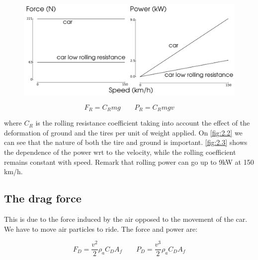 	\begin{figure}
	\vspace{-5mm}
	\includegraphics[scale=0.3]{ch2/3}
	\label{fig:2.3}
	\end{figure}
	\begin{equation}
	F_R = C_R m g \qquad P_R = C_R mg v
	\end{equation}
	
	where $C_R$ is the rolling resistance coefficient taking into account the effect of the deformation of ground and the tires per unit of weight applied. On \autoref{fig:2.2} we can see that the nature of both the tire and ground is important. \autoref{fig:2.3} shows the dependence of the power wrt to the velocity, while the rolling coefficient remains constant with speed. Remark that rolling power can go up to 9kW at 150 km/h. 
	
\subsection{The drag force}
	This is due to the force induced by the air opposed to the movement of the car. We have to move air particles to ride. The force and power are:
	
	\begin{equation}
	F_D = \frac{v^2}{2} \rho _a C_D A_f\qquad P_D = \frac{v^3}{2} \rho _a C_D A_f
	\end{equation}
	
